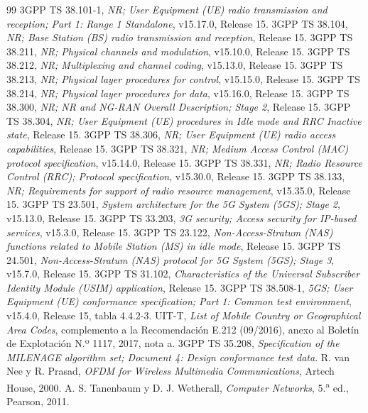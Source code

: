 \begin{thebibliography}{99}
 3GPP TS 38.101-1, \emph{NR; User Equipment (UE) radio transmission and reception; Part 1: Range 1 Standalone}, v15.17.0, Release 15.
 3GPP TS 38.104, \emph{NR; Base Station (BS) radio transmission and reception}, Release 15.
 3GPP TS 38.211, \emph{NR; Physical channels and modulation}, v15.10.0, Release 15.
 3GPP TS 38.212, \emph{NR; Multiplexing and channel coding}, v15.13.0, Release 15.
 3GPP TS 38.213, \emph{NR; Physical layer procedures for control}, v15.15.0, Release 15.
 3GPP TS 38.214, \emph{NR; Physical layer procedures for data}, v15.16.0, Release 15.
 3GPP TS 38.300, \emph{NR; NR and NG-RAN Overall Description; Stage 2}, Release 15.
 3GPP TS 38.304, \emph{NR; User Equipment (UE) procedures in Idle mode and RRC Inactive state}, Release 15.
 3GPP TS 38.306, \emph{NR; User Equipment (UE) radio access capabilities}, Release 15.
 3GPP TS 38.321, \emph{NR; Medium Access Control (MAC) protocol specification}, v15.14.0, Release 15.
 3GPP TS 38.331, \emph{NR; Radio Resource Control (RRC); Protocol specification}, v15.30.0, Release 15.
 3GPP TS 38.133, \emph{NR; Requirements for support of radio resource management}, v15.35.0, Release 15.
 3GPP TS 23.501, \emph{System architecture for the 5G System (5GS); Stage 2}, v15.13.0, Release 15.
 3GPP TS 33.203, \emph{3G security; Access security for IP-based services}, v15.3.0, Release 15.
 3GPP TS 23.122, \emph{Non-Access-Stratum (NAS) functions related to Mobile Station (MS) in idle mode}, Release 15.
 3GPP TS 24.501, \emph{Non-Access-Stratum (NAS) protocol for 5G System (5GS); Stage 3}, v15.7.0, Release 15.
 3GPP TS 31.102, \emph{Characteristics of the Universal Subscriber Identity Module (USIM) application}, Release 15.
 3GPP TS 38.508-1, \emph{5GS; User Equipment (UE) conformance specification; Part 1: Common test environment}, v15.4.0, Release 15, tabla 4.4.2-3.
 UIT-T, \emph{List of Mobile Country or Geographical Area Codes}, complemento a la Recomendación E.212 (09/2016), anexo al Boletín de Explotación N.º 1117, 2017, nota a.
 3GPP TS 35.208, \emph{Specification of the MILENAGE algorithm set; Document 4: Design conformance test data}.
 R. van Nee y R. Prasad, \emph{OFDM for Wireless Multimedia Communications}, Artech House, 2000.
 A. S. Tanenbaum y D. J. Wetherall, \emph{Computer Networks}, 5.\textsuperscript{a} ed., Pearson, 2011.
\end{thebibliography}
